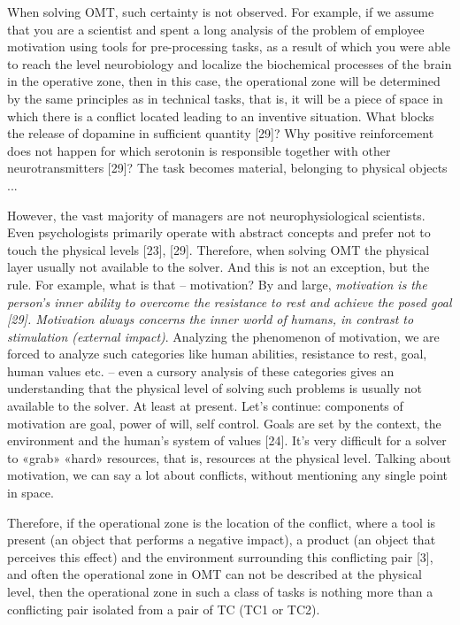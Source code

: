 \documentclass[11pt,a4paper]{book}
\begin{document}
When solving OMT, such certainty is not observed. For example, if we assume
that you are a scientist and spent a long analysis of the problem of employee
motivation using tools for pre-processing tasks, as a result of which you were
able to reach the level neurobiology and localize the biochemical processes of
the brain in the operative zone, then in this case, the operational zone will
be determined by the same principles as in technical tasks, that is, it will
be a piece of space in which there is a conflict located leading to an
inventive situation. What blocks the release of dopamine in sufficient
quantity [29]? Why positive reinforcement does not happen for which serotonin
is responsible together with other neurotransmitters [29]? The task becomes
material, belonging to physical objects ...

However, the vast majority of managers are not neurophysiological scientists.
Even psychologists primarily operate with abstract concepts and prefer not to
touch the physical levels [23], [29]. Therefore, when solving OMT the physical
layer usually not available to the solver. And this is not an exception, but
the rule. For example, what is that -- motivation? By and large,
\emph{motivation is the person’s inner ability to overcome the resistance to
  rest and achieve the posed goal [29]. Motivation always concerns the inner
  world of humans, in contrast to stimulation (external impact)}. Analyzing
the phenomenon of motivation, we are forced to analyze such categories like
human abilities, resistance to rest, goal, human values etc. -- even a cursory
analysis of these categories gives an understanding that the physical level of
solving such problems is usually not available to the solver. At least at
present.  Let's continue: components of motivation are goal, power of will,
self control. Goals are set by the context, the environment and the human's
system of values [24]. It’s very difficult for a solver to «grab» «hard»
resources, that is, resources at the physical level. Talking about motivation,
we can say a lot about conflicts, without mentioning any single point in
space.

Therefore, if the operational zone is the location of the conflict, where a
tool is present (an object that performs a negative impact), a product (an
object that perceives this effect) and the environment surrounding this
conflicting pair [3], and often the operational zone in OMT can not be
described at the physical level, then the operational zone in such a class of
tasks is nothing more than a conflicting pair isolated from a pair of TC (TC1
or TC2).
\end{document}
